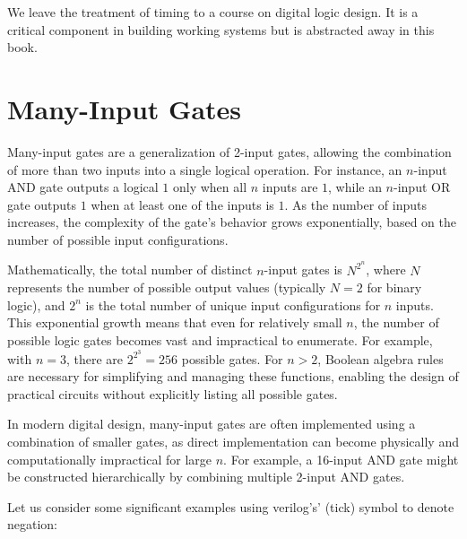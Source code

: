 We leave the treatment of timing to a course on digital logic design. It is a critical component in building working systems but is abstracted away in this book.

\section{Many-Input Gates}
Many-input gates are a generalization of 2-input gates, allowing the combination of more than two inputs into a single logical operation. For instance, an \( n \)-input AND gate outputs a logical \( 1 \) only when all \( n \) inputs are \( 1 \), while an \( n \)-input OR gate outputs \( 1 \) when at least one of the inputs is \( 1 \). As the number of inputs increases, the complexity of the gate's behavior grows exponentially, based on the number of possible input configurations.

Mathematically, the total number of distinct \( n \)-input gates is \( N^{2^n} \), where \( N \) represents the number of possible output values (typically \( N = 2 \) for binary logic), and \( 2^n \) is the total number of unique input configurations for \( n \) inputs. This exponential growth means that even for relatively small \( n \), the number of possible logic gates becomes vast and impractical to enumerate. For example, with \( n = 3 \), there are \( 2^{2^3} = 256 \) possible gates. For \( n > 2 \), Boolean algebra rules are necessary for simplifying and managing these functions, enabling the design of practical circuits without explicitly listing all possible gates.

In modern digital design, many-input gates are often implemented using a combination of smaller gates, as direct implementation can become physically and computationally impractical for large \( n \). For example, a 16-input AND gate might be constructed hierarchically by combining multiple 2-input AND gates. 

Let us consider some significant examples using verilog's' (tick) symbol to denote negation:

